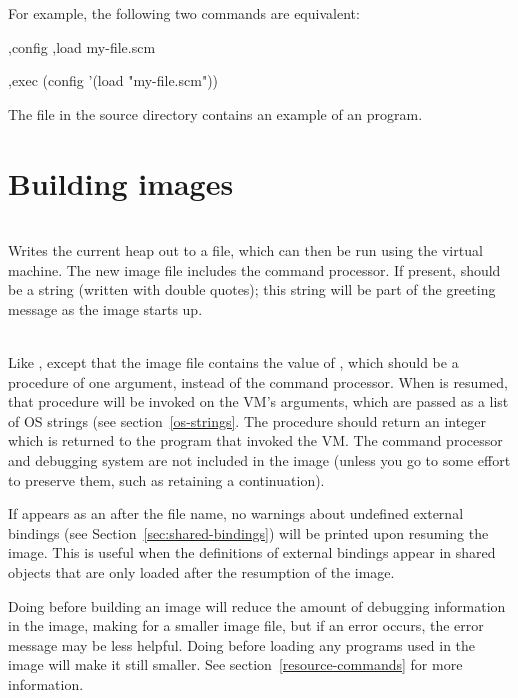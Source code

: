 For example, the following two commands are equivalent:
\begin{example}
,config ,load my-file.scm

,exec (config '(load "my-file.scm"))
\end{example}

The file  in the source directory contains an
 example of an  program.

\section{Building images}

\begin{description}
\item {}\\
    Writes the current heap out to a file, which can then be run using the
    virtual machine.  The new image file includes the command processor.
    If present, 
    should be a string (written with double quotes); this string will
    be part of the greeting message as the image starts up.

\item {}\\
    Like , except that the image file contains the value of
    , which should be a procedure of one argument, instead of
    the command processor.  When
     is resumed, that procedure will be invoked on the VM's
     arguments, which are passed as a list of OS strings (see
    section~\ref{os-strings}.  The
    procedure should return an integer which is
    returned to the program that invoked the VM.  The command
    processor and debugging system are not included in the image
    (unless you go to some effort to preserve them, such as retaining
    a continuation).
    
    If  appears as an  after the file
    name, no warnings about undefined external bindings
    (see Section~\ref{sec:shared-bindings}) will be printed upon
    resuming the image.  This is useful when the definitions of
    external bindings appear in shared objects that are only loaded
    after the resumption of the image.

    Doing  before building an image will reduce the amount
    of debugging information in the image, making for a smaller
    image file, but if an error occurs, the error message may be less
    helpful.  Doing  before loading any programs
    used in the image will make it still smaller.
    See section~\ref{resource-commands}
    for more information.

\end{description}
    
